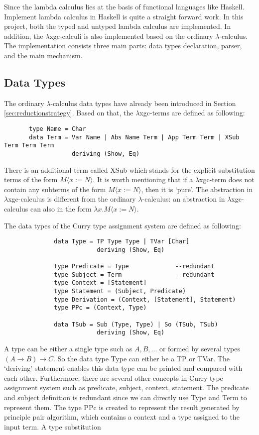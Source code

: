 Since the lambda calculus lies at the basis of functional languages like Haskell. Implement lambda calculus in Haskell is quite a straight forward work. In this project, both the typed and untyped lambda calculus are implemented. In addition, the $\lambda$xgc-calculi is also implemented based on the ordinary $\lambda$-calculus. The implementation consists three main parts: data types declaration, parser, and the main mechanism.

\subsection{Data Types}\label{subs:dt}

The ordinary $\lambda$-calculus data types have already been introduced in Section \ref{sec:reductionstrategy}. Based on that, the $\lambda$xgc-terms are defined as following: 
\begin{verbatim}
       type Name = Char  
       data Term = Var Name | Abs Name Term | App Term Term | XSub Term Term Term
                   deriving (Show, Eq)
\end{verbatim}
There is an additional term called \textsf{XSub} which stands for the explicit substitution terms of the form $M\langle x := N\rangle$. It is worth mentioning that if a $\lambda$xgc-term does not contain any subterms of the form $M\langle x := N\rangle$, then it is `pure'. The abstraction in $\lambda$xgc-calculus is different from the ordinary $\lambda$-calculus: an abstraction in $\lambda$xgc-calculus can also in the form $\lambda x.M\langle x := N\rangle$.

The data types of the Curry type assignment system are defined as following:
\begin{verbatim}
              data Type = TP Type Type | TVar [Char]
                          deriving (Show, Eq)
            
              type Predicate = Type             --redundant  
              type Subject = Term               --redundant 
              type Context = [Statement]
              type Statement = (Subject, Predicate)
              type Derivation = (Context, [Statement], Statement)
              type PPc = (Context, Type)

              data TSub = Sub (Type, Type) | So (TSub, TSub)
                          deriving (Show, Eq)
\end{verbatim}

A type can be either a single type such as $A, B,...$ or formed by several types $(A\rightarrow B)\rightarrow C$. So the data type \textsf{Type} can either be a \textsf{TP} or \textsf{TVar}. The `deriving' statement enables this data type can be printed and compared with each other. Furthermore, there are several other concepts in Curry type assignment system such as \textsf{predicate, subject, context, statement}. The \textsf{predicate} and \textsf{subject} definition is redundant since we can directly use \textsf{Type} and \textsf{Term} to represent them. The type PPc is created to represent the result generated by principle pair algorithm, which contains a context and a type assigned to the input term. A type substitution   



